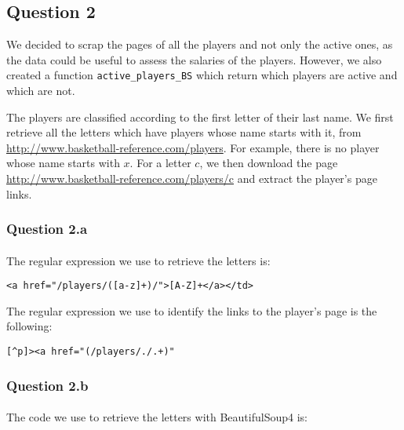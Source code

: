 
\subsection{Question 2}
\label{subsec:312}
We decided to scrap the pages of all the players and not only the active ones, as the data could be useful to assess the salaries of the players. However, we also created a function \verb|active_players_BS| which return which players are active and which are not.

The players are classified according to the first letter of their last name. We first retrieve all the letters which have players whose name starts with it, from \url{http://www.basketball-reference.com/players}. For example, there is no player whose name starts with $x$. For a letter $c$, we then download the page \url{http://www.basketball-reference.com/players/c} and extract the player's page links.

\subsubsection{Question 2.a}
\label{subsubsec:312a}
\paragraph{} The regular expression we use to retrieve the letters is:

\begin{verbatim}
<a href="/players/([a-z]+)/">[A-Z]+</a></td>
\end{verbatim}


The regular expression we use to identify the links to the player's page is the following:

\begin{verbatim}
[^p]><a href="(/players/./.+)"
\end{verbatim}

\subsubsection{Question 2.b}
\label{subsubsec:312b}

\paragraph{}The code we use to retrieve the letters with BeautifulSoup4 is:

